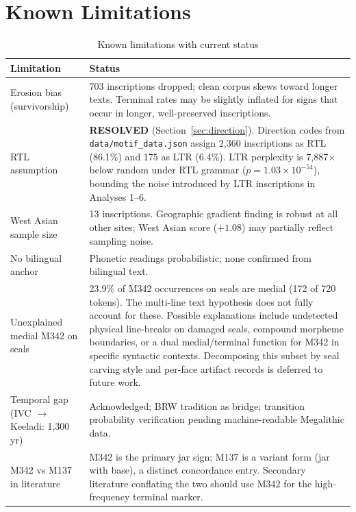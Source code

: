 \documentclass[12pt,letterpaper]{article}
\begin{document}
\section{Known Limitations}
\label{sec:limitations}

\begin{table}[htbp]
\centering
\caption{Known limitations with current status}
\begin{tabularx}{\textwidth}{p{4.5cm}X}
\toprule
Limitation & Status \\
\midrule
Erosion bias (survivorship) &
703 inscriptions dropped; clean corpus skews toward longer texts.
Terminal rates may be slightly inflated for signs that occur in
longer, well-preserved inscriptions. \\
\addlinespace
RTL assumption &
\textbf{RESOLVED} (Section~\ref{sec:direction}).
Direction codes from \texttt{data/motif\_data.json} assign 2,360
inscriptions as RTL (86.1\%) and 175 as LTR (6.4\%).
LTR perplexity is 7,887$\times$ below random under RTL grammar
($p = 1.03 \times 10^{-54}$), bounding the noise introduced by
LTR inscriptions in Analyses 1--6. \\
\addlinespace
West Asian sample size &
13 inscriptions. Geographic gradient finding is robust at all other
sites; West Asian score ($+1.08$) may partially reflect sampling noise. \\
\addlinespace
No bilingual anchor &
Phonetic readings probabilistic; none confirmed from bilingual text. \\
\addlinespace
Unexplained medial M342 on seals &
23.9\% of M342 occurrences on seals are medial (172 of 720 tokens).
The multi-line text hypothesis does not fully account for these.
Possible explanations include undetected physical line-breaks on
damaged seals, compound morpheme boundaries, or a dual medial/terminal
function for M342 in specific syntactic contexts.
Decomposing this subset by seal carving style and per-face artifact
records is deferred to future work. \\
\addlinespace
Temporal gap (IVC $\to$ Keeladi: 1,300 yr) &
Acknowledged; BRW tradition as bridge; transition probability
verification pending machine-readable Megalithic data. \\
\addlinespace
M342 vs M137 in literature &
M342 is the primary jar sign; M137 is a variant form (jar with base),
a distinct concordance entry. Secondary literature conflating the two
should use M342 for the high-frequency terminal marker. \\

\end{tabularx}
\end{table}
\end{document}

